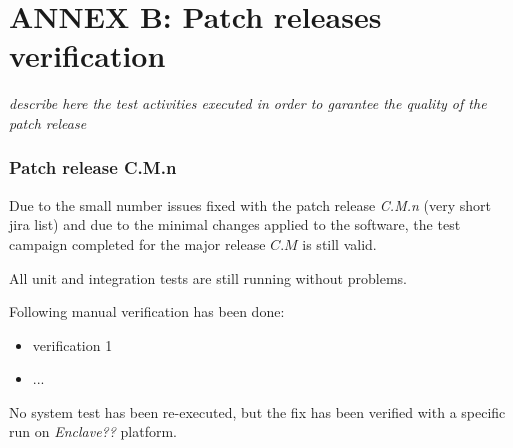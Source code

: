\documentclass[DM,lsstdraft,STR,toc]{lsstdoc}
\begin{document}
\newpage
\section{ANNEX B: Patch releases verification}

{\it describe here the test activities executed in order to garantee the quality of the patch release}

\subsubsection{Patch release C.M.n}

Due to the small number issues fixed with the {\it \product} patch release {\it C.M.n} (very short jira list)
and due to the minimal changes applied to the software, the test campaign completed for the {\it \product} major
release $C.M$ is still valid.

All unit and integration tests are still running without problems.

Following manual verification has been done:

\begin{itemize}
\item verification 1
\item ...
\end{itemize}

No system test has been re-executed, but the fix has been verified with a specific run
on {\it Enclave??} platform.
\end{document}
